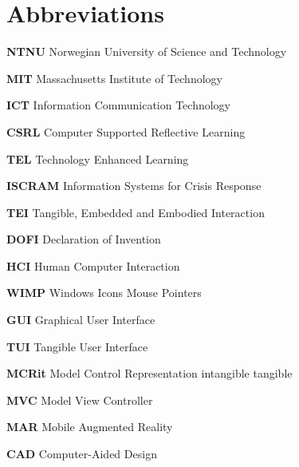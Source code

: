 \chapter*{Abbreviations}\label{abbreviations}

\textbf{NTNU} Norwegian University of Science and Technology

\textbf{MIT} Massachusetts Institute of Technology

\textbf{ICT} Information Communication Technology

\textbf{CSRL} Computer Supported Reflective Learning

\textbf{TEL} Technology Enhanced Learning

\textbf{ISCRAM} Information Systems for Crisis Response

\textbf{TEI} Tangible, Embedded and Embodied Interaction

\textbf{DOFI} Declaration of Invention

\textbf{HCI} Human Computer Interaction

\textbf{WIMP} Windows Icons Mouse Pointers

\textbf{GUI} Graphical User Interface

\textbf{TUI} Tangible User Interface

\textbf{MCRit} Model Control Representation intangible tangible

\textbf{MVC} Model View Controller

\textbf{MAR} Mobile Augmented Reality

\textbf{CAD} Computer-Aided Design
